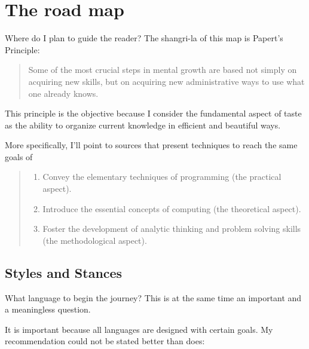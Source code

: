 \section{The road map} 

Where do I plan to guide the reader? The shangri-la of this map is 
Papert's Principle:

\begin{quote}
    Some of the most crucial steps in mental growth are based
    not simply on acquiring new skills, but on acquiring new administrative ways to
    use what one already knows. \cite{artificial_intelligence:minsky__society_of_mind}
\end{quote}

This principle is the objective because I consider the fundamental aspect of
taste as the ability to organize current knowledge in efficient and beautiful
ways.

More specifically, I'll point to sources that present techniques to reach the
same goals of \cite{education:keller__the_risks_and_benefits_of_teaching_purely_functional}

\begin{quote}
    \begin{enumerate}
    \item Convey the elementary techniques of programming (the practical aspect). 
    \item Introduce the essential concepts of computing (the theoretical aspect). 
    \item Foster the development of analytic thinking and problem solving skills (the methodological aspect).
    \end{enumerate}
\end{quote}

\subsection{Styles and Stances}

What language to begin the journey? This is at the same time an important and a
meaningless question. 

It is important because all languages are designed with certain goals. My
recommendation could not be stated better than
\cite{education:norvig__teach_yourself_programming} does:

